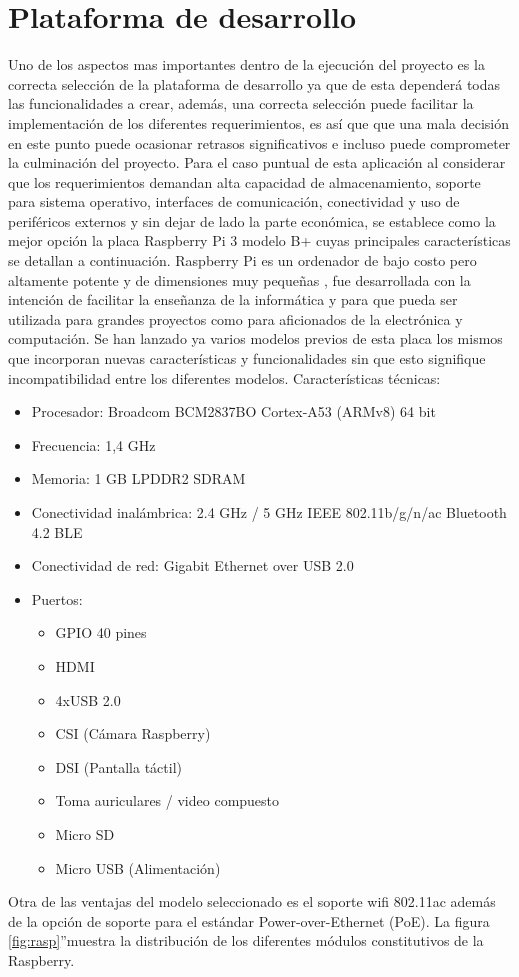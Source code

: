 \section{Plataforma de desarrollo}
Uno de los aspectos mas importantes dentro de la ejecución del proyecto es la correcta selección de la plataforma de desarrollo ya que de esta dependerá todas las funcionalidades a crear, además, una correcta selección puede facilitar  la implementación de los diferentes requerimientos, es así que que una mala decisión en este punto puede ocasionar retrasos significativos e incluso puede comprometer la culminación del proyecto.
Para el caso puntual de esta aplicación al considerar que los requerimientos demandan alta capacidad de almacenamiento, soporte para sistema operativo, interfaces de comunicación, conectividad y uso de periféricos externos y sin dejar de lado la parte económica, se establece como la mejor opción la placa Raspberry Pi 3 modelo B+ cuyas principales características se detallan a continuación.
Raspberry Pi es un ordenador de bajo costo pero altamente potente y de dimensiones muy pequeñas , fue desarrollada con la intención de facilitar la enseñanza de la informática y para que pueda ser utilizada para grandes proyectos como para aficionados de la electrónica y computación.
Se han lanzado ya varios modelos previos de esta placa los mismos que incorporan nuevas características y funcionalidades sin que esto signifique incompatibilidad entre los diferentes modelos.
Características técnicas:
\begin{itemize}
\item Procesador: Broadcom BCM2837BO Cortex-A53 (ARMv8) 64 bit
\item Frecuencia: 1,4 GHz
\item Memoria: 1 GB LPDDR2 SDRAM
\item Conectividad inalámbrica: 2.4 GHz / 5 GHz IEEE 802.11b/g/n/ac Bluetooth 4.2 BLE
\item Conectividad de red: Gigabit Ethernet over USB 2.0
\item Puertos:
\begin{itemize}
\item GPIO 40 pines
\item HDMI
\item 4xUSB 2.0
\item CSI (Cámara Raspberry)
\item DSI (Pantalla táctil)
\item Toma auriculares / video compuesto
\item Micro SD
\item Micro USB (Alimentación) 
\end{itemize}
\end{itemize}
Otra de las ventajas del modelo seleccionado es el soporte wifi 802.11ac además de la opción de soporte para el estándar Power-over-Ethernet (PoE).
La figura \ref{fig:rasp}''muestra la distribución de los diferentes módulos constitutivos de la Raspberry.

